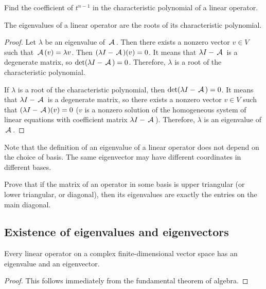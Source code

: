 \begin{exercise}
Find the coefficient of $t^{n-1}$ in the characteristic polynomial of a linear operator.
\end{exercise}

\begin{lemma}
The eigenvalues of a linear operator are the roots of its characteristic polynomial.
\end{lemma}

\begin{proof}
Let $\lambda$ be an eigenvalue of $\,\mathcal{A}\,$. Then there exists a nonzero vector $v \in V$ such that $\,\mathcal{A}\,(v) = \lambda v$. Then $(\lambda I - \,\mathcal{A}\,)(v) = 0$. It means that $\lambda I - \,\mathcal{A}\,$ is a degenerate matrix, so $\det(\lambda I - \,\mathcal{A}\,) = 0$. Therefore, $\lambda$ is a root of the characteristic polynomial.

If $\lambda$ is a root of the characteristic polynomial, then $\det(\lambda I - \,\mathcal{A}\,) = 0$. It means that $\lambda I - \,\mathcal{A}\,$ is a degenerate matrix, so there exists a nonzero vector $v \in V$ such that $(\lambda I - \,\mathcal{A}\,)(v) = 0$ ($v$ is a nonzero solution of the homogeneous system of linear equations with coefficient matrix $\lambda I - \,\mathcal{A}\,$). Therefore, $\lambda$ is an eigenvalue of $\,\mathcal{A}\,$.
\end{proof}

\begin{remark}
Note that the definition of an eigenvalue of a linear operator does not depend on the choice of basis. The same eigenvector may have different coordinates in different bases.
\end{remark}

\begin{exercise}
Prove that if the matrix of an operator in some basis is upper triangular (or lower triangular, or diagonal), then its eigenvalues are exactly the entries on the main diagonal.
\end{exercise}

\subsection{Existence of eigenvalues and eigenvectors}

\begin{lemma}
    Every linear operator on a complex finite-dimensional vector space has an eigenvalue and an eigenvector.
\end{lemma}
    
\begin{proof}
This follows immediately from the fundamental theorem of algebra.
\end{proof}


